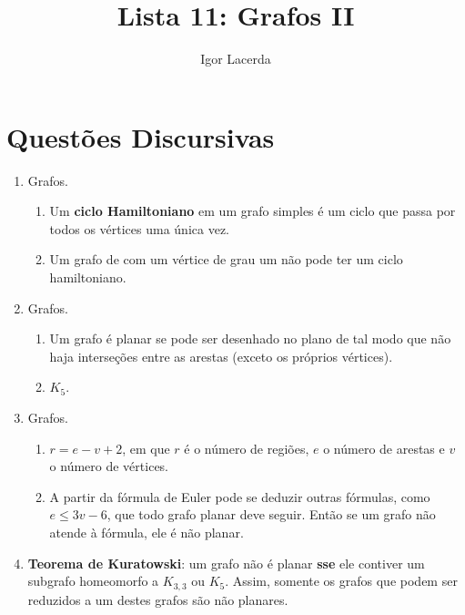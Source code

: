 \documentclass{article}
\title{Lista 11: Grafos II}
\author{Igor Lacerda}
\begin{document}
\maketitle

\section*{Questões Discursivas}

\begin{enumerate}
	\item Grafos.
	      \begin{enumerate}

		      \item Um \textbf{ciclo Hamiltoniano} em um grafo simples é um ciclo que passa por todos os vértices uma única vez.

		      \item Um grafo de com um vértice de grau um não pode ter um ciclo hamiltoniano.

	      \end{enumerate}

	\item Grafos.

	      \begin{enumerate}

		      \item Um grafo é planar se pode ser desenhado no plano de tal modo que não haja interseções entre as arestas (exceto os próprios vértices).

		      \item \( K_5 \).

	      \end{enumerate}

	\item Grafos.
	      \begin{enumerate}

		      \item \( r = e - v + 2 \), em que \( r \) é o número de regiões, \( e \) o número de arestas e \( v \) o número de vértices.

		      \item A partir da fórmula de Euler pode se deduzir outras fórmulas, como \( e \leq 3v - 6 \), que todo grafo planar deve seguir. Então se um grafo não atende à fórmula, ele é não planar.

	      \end{enumerate}

	\item \textbf{Teorema de Kuratowski}: um grafo não é planar \textbf{sse} ele contiver um subgrafo homeomorfo a \( K_{3,3} \) ou \( K_5 \). Assim, somente os grafos que podem ser reduzidos a um destes grafos são não planares.


\end{enumerate}
\end{document}

